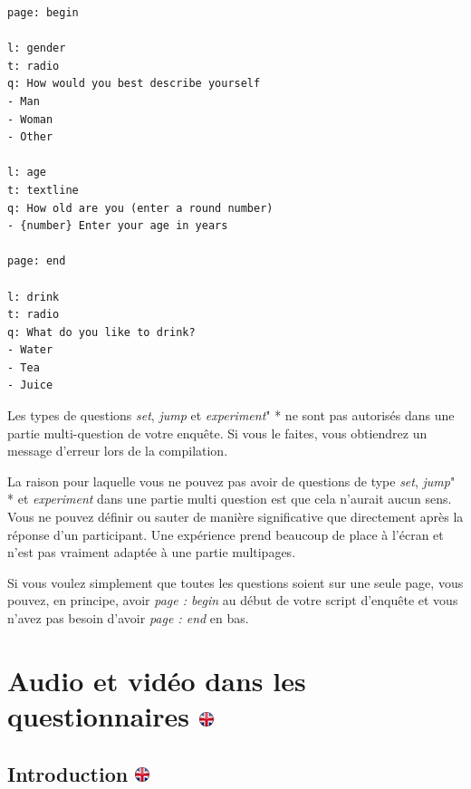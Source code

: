\documentclass[
]{book}
\begin{document}
\begin{verbatim}
page: begin

l: gender
t: radio
q: How would you best describe yourself
- Man
- Woman
- Other

l: age
t: textline
q: How old are you (enter a round number)
- {number} Enter your age in years

page: end

l: drink
t: radio
q: What do you like to drink?
- Water
- Tea
- Juice
\end{verbatim}

Les types de questions \emph{set}, \emph{jump} et \emph{experiment}" * ne sont pas autorisés dans une partie multi-question de votre enquête. Si vous le faites, vous obtiendrez un message d'erreur lors de la compilation.

La raison pour laquelle vous ne pouvez pas avoir de questions de type \emph{set}, \emph{jump}" * et \emph{experiment} dans une partie multi question est que cela n'aurait aucun sens. Vous ne pouvez définir ou sauter de manière significative que directement après la réponse d'un participant. Une expérience prend beaucoup de place à l'écran et n'est pas vraiment adaptée à une partie multipages.

Si vous voulez simplement que toutes les questions soient sur une seule page, vous pouvez, en principe, avoir \emph{page : begin} au début de votre script d'enquête et vous n'avez pas besoin d'avoir \emph{page : end} en bas.

\hypertarget{audio-et-viduxe9o-dans-les-questionnaires}{%
\chapter[Audio et vidéo dans les questionnaires ]{\texorpdfstring{Audio et vidéo dans les questionnaires \href{https://www.psytoolkit.org/lessons/surveyaudiovideo.html}{\protect\includegraphics{img/ukflag.png}}}{Audio et vidéo dans les questionnaires }}\label{audio-et-viduxe9o-dans-les-questionnaires}}

\hypertarget{introduction}{%
\section[Introduction ]{\texorpdfstring{Introduction \href{https://www.psytoolkit.org/lessons/surveyaudiovideo.html\#_introduction}{\protect\includegraphics{img/ukflag.png}}}{Introduction }}\label{introduction}}
\end{document}
